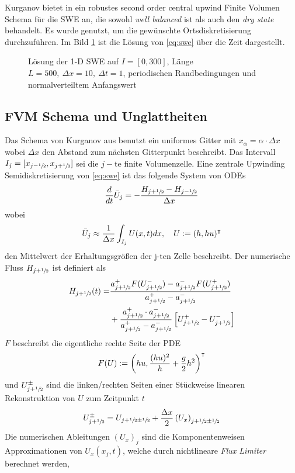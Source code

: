 Kurganov bietet in \cite{kurganov2007second} ein robustes second order central upwind Finite Volumen Schema für die SWE an, die sowohl \textit{well balanced} ist als auch den \textit{dry state} behandelt. Es wurde genutzt, um die gewünschte Ortsdiskretisierung durchzuführen. Im Bild \ref{fig:sweSolution} ist die Lösung von \eqref{eq:swe} über die Zeit dargestellt.

\begin{figure}
 \centering
 
 \caption{Lösung der 1-D SWE auf $I=[0,300]$, Länge $L=500,~\Delta x=10,~\Delta t=1$, periodischen Randbedingungen und normalverteiltem Anfangswert}
 \label{fig:sweSolution}
\end{figure}

\subsection{FVM Schema und Unglattheiten}
\label{sec:fvmFluxEigen}
Das Schema von Kurganov aus \cite{kurganov2007second} benutzt ein uniformes Gitter mit $x_\alpha=\alpha\cdot \Delta x$ wobei $\Delta x$ den Abstand zum nächsten Gitterpunkt beschreibt. Das Intervall $I_j = [x_{j-\sfrac{1}{2}},x_{j+\sfrac{1}{2}}]$ sei die $j-$te finite Volumenzelle.
Eine zentrale Upwinding Semidiskretisierung von \eqref{eq:swe} ist das folgende System von ODEs
\[
 \frac{d}{dt} \bar U_j = - \frac{H_{j+\sfrac{1}{2}}-H_{j-\sfrac{1}{2}}}{\Delta x}
\]
wobei 
\[
 \bar U_j \approx \frac{1}{\Delta x}\int_{I_j} U(x,t) dx, \quad U:=(h,hu)^\intercal
\]
den Mittelwert der Erhaltungsgrößen der j-ten Zelle beschreibt. Der numerische Fluss $H_{j+\sfrac{1}{2}}$ ist definiert als
\[
\begin{aligned}
 H_{j+\sfrac{1}{2}}(t) =& \frac{a^+_{j+\sfrac{1}{2}}F(U^-_{j+\sfrac{1}{2}}) - a^-_{j+\sfrac{1}{2}}F(U^+_{j+\sfrac{1}{2}})}{a^+_{j+\sfrac{1}{2}} -a^-_{j+\sfrac{1}{2}}} \\
 & +\frac{a^+_{j+\sfrac{1}{2}} \cdot a^-_{j+\sfrac{1}{2}}}{a^+_{j+\sfrac{1}{2}} -a^-_{j+\sfrac{1}{2}}}\left[U^+_{j+\sfrac{1}{2}} - U^-_{j+\sfrac{1}{2}}\right]
\end{aligned}
 \]
$F$ beschreibt die eigentliche rechte Seite der PDE
\[
 F(U) := \left( hu, \frac{(hu)^2}{h}  +\frac{g}{2} h^2 \right)^\intercal
\]
und $U^\pm_{j+\sfrac{1}{2}}$ sind die linken/rechten Seiten einer Stückweise linearen Rekonstruktion von $U$ zum Zeitpunkt $t$
\[
 U^\pm_{j+\sfrac{1}{2}} = U_{j+\sfrac{1}{2} \pm \sfrac{1}{2}} + \frac{\Delta x}{2} \left(U_x\right)_{j+\sfrac{1}{2}\pm\sfrac{1}{2}}
\]
Die numerischen Ableitungen $(U_x)_j$ sind die Komponentenweisen Approximationen von $U_x(x_j ,t)$, welche durch nichtlineare \textit{Flux Limiter} berechnet werden, 

